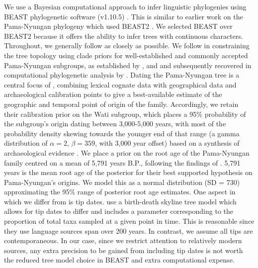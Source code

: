 We use a Bayesian computational approach to infer linguistic phylogenies using BEAST phylogenetic software (v1.10.5) \autocite{suchard_bayesian_2018}. This is similar to earlier work on the Pama-Nyungan phylogeny \autocites{bowern_computational_2012}{bouckaert_origin_2018} which used BEAST2 \autocite{bouckaert_beast_2019}. We selected BEAST over BEAST2 because it offers the ability to infer trees with continuous characters. Throughout, we generally follow \textcite{bouckaert_origin_2018} as closely as possible. We follow \textcite{bouckaert_origin_2018} in constraining the tree topology using clade priors for well-established and commonly accepted Pama-Nyungan subgroups, as established by \textcite{ogrady_languages_1966}, \textcite{muhlhausler_atlas_1996} and \textcite{koch_languages_2014} and subsequently recovered in computational phylogenetic analysis by \textcite{bowern_computational_2012}. Dating the Pama-Nyungan tree is a central focus of \textcite{bouckaert_origin_2018}, combining lexical cognate data with geographical data and archaeological calibration points to give a best-available estimate of the geographic and temporal point of origin of the family. Accordingly, we retain their calibration prior on the Wati subgroup, which places a 95\% probability of the subgroup's origin dating between 3,000-5,000 years, with most of the probability density skewing towards the younger end of that range (a gamma distribution of \(\alpha = 2\), \(\beta = 359\), with 3,000 year offset) based on a synthesis of archaeological evidence \autocite[see][p.~746]{bouckaert_origin_2018}. We place a prior on the root age of the Pama-Nyungan family centred on a mean of 5,791 years B.P., following the findings of \textcite{bouckaert_origin_2018}. 5,791 years is the mean root age of the posterior for their best supported hypothesis on Pama-Nyungan's origins. We model this as a normal distribution (SD = 730) approximating the 95\% range of posterior root age estimates. One aspect in which we differ from \textcite{bouckaert_origin_2018} is tip dates. \textcite{bouckaert_origin_2018} use a birth-death skyline tree model which allows for tip dates to differ and includes a parameter corresponding to the proportion of total taxa sampled at a given point in time. This is reasonable since they use language sources span over 200 years. In contrast, we assume all tips are contemporaneous. In our case, since we restrict attention to relatively modern sources, any extra precision to be gained from including tip dates is not worth the reduced tree model choice in BEAST and extra computational expense.


